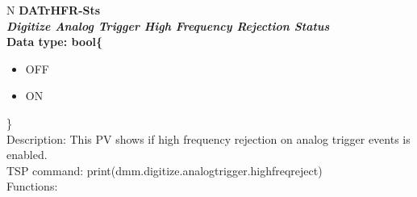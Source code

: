 \documentclass[openany]{article}
\begin{document}
		\begin{tabular}{N}
			\hline
			\bfseries DATrHFR-Sts\label{pv:datrhfr-sts} \\ \hline
			\emph{Digitize Analog Trigger High Frequency Rejection Status} \\
			Data type: bool\{\begin{itemize}[noitemsep]
				\small
				\item[] OFF
				\item[] ON
			\end{itemize}\} \\
			Description: This PV shows if high frequency rejection on analog trigger events is enabled. \\
			TSP command: print(dmm.digitize.analogtrigger.highfreqreject) \\
			Functions: \\
			\arrayrulecolor{\FuncTableBorderColor}

		\end{tabular}
\end{document}
